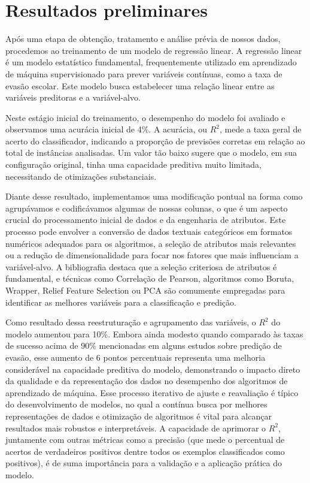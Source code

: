 \documentclass[english, spanish, brazilian]{RBIEarticle} %
\begin{document}

\section{Resultados preliminares}
Após uma etapa de obtenção, tratamento e análise prévia de nossos dados, procedemos ao treinamento de um modelo de regressão linear. A regressão linear é um modelo estatístico fundamental, frequentemente utilizado em aprendizado de máquina supervisionado para prever variáveis contínuas, como a taxa de evasão escolar. Este modelo busca estabelecer uma relação linear entre as variáveis preditoras e a variável-alvo.

Neste estágio inicial do treinamento, o desempenho do modelo foi avaliado e observamos uma acurácia inicial de 4\%. A acurácia, ou $R^2$, mede a taxa geral de acerto do classificador, indicando a proporção de previsões corretas em relação ao total de instâncias analisadas. Um valor tão baixo sugere que o modelo, em sua configuração original, tinha uma capacidade preditiva muito limitada, necessitando de otimizações substanciais.

Diante desse resultado, implementamos uma modificação pontual na forma como agrupávamos e codificávamos algumas de nossas colunas, o que é um aspecto crucial do processamento inicial de dados e da engenharia de atributos. Este processo pode envolver a conversão de dados textuais categóricos em formatos numéricos adequados para os algoritmos, a seleção de atributos mais relevantes ou a redução de dimensionalidade para focar nos fatores que mais influenciam a variável-alvo. A bibliografia destaca que a seleção criteriosa de atributos é fundamental, e técnicas como Correlação de Pearson, algoritmos como Boruta, Wrapper, Relief Feature Selection ou PCA são comumente empregadas para identificar as melhores variáveis para a classificação e predição.

Como resultado dessa reestruturação e agrupamento das variáveis, o $R^2$ do modelo aumentou para 10\%. Embora ainda modesto quando comparado às taxas de sucesso acima de 90\% mencionadas em alguns estudos sobre predição de evasão, esse aumento de 6 pontos percentuais representa uma melhoria considerável na capacidade preditiva do modelo, demonstrando o impacto direto da qualidade e da representação dos dados no desempenho dos algoritmos de aprendizado de máquina. Esse processo iterativo de ajuste e reavaliação é típico do desenvolvimento de modelos, no qual a contínua busca por melhores representações de dados e otimização de algoritmos é vital para alcançar resultados mais robustos e interpretáveis. A capacidade de aprimorar o $R^2$, juntamente com outras métricas como a precisão (que mede o percentual de acertos de verdadeiros positivos dentre todos os exemplos classificados como positivos), é de suma importância para a validação e a aplicação prática do modelo.
\end{document}
